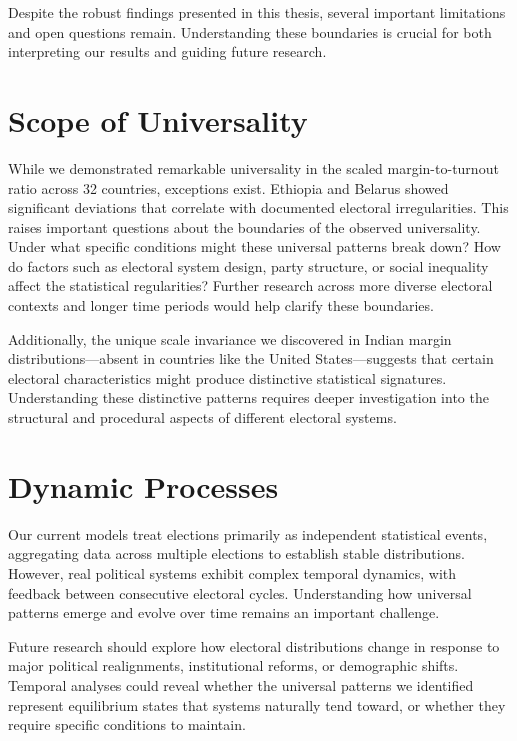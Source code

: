 Despite the robust findings presented in this thesis, several important limitations and open questions remain. Understanding these boundaries is crucial for both interpreting our results and guiding future research.

\section{Scope of Universality}

While we demonstrated remarkable universality in the scaled margin-to-turnout ratio across 32 countries, exceptions exist. Ethiopia and Belarus showed significant deviations that correlate with documented electoral irregularities. This raises important questions about the boundaries of the observed universality. Under what specific conditions might these universal patterns break down? How do factors such as electoral system design, party structure, or social inequality affect the statistical regularities? Further research across more diverse electoral contexts and longer time periods would help clarify these boundaries.

Additionally, the unique scale invariance we discovered in Indian margin distributions—absent in countries like the United States—suggests that certain electoral characteristics might produce distinctive statistical signatures. Understanding these distinctive patterns requires deeper investigation into the structural and procedural aspects of different electoral systems.

\section{Dynamic Processes}

Our current models treat elections primarily as independent statistical events, aggregating data across multiple elections to establish stable distributions. However, real political systems exhibit complex temporal dynamics, with feedback between consecutive electoral cycles. Understanding how universal patterns emerge and evolve over time remains an important challenge.

Future research should explore how electoral distributions change in response to major political realignments, institutional reforms, or demographic shifts. Temporal analyses could reveal whether the universal patterns we identified represent equilibrium states that systems naturally tend toward, or whether they require specific conditions to maintain.

